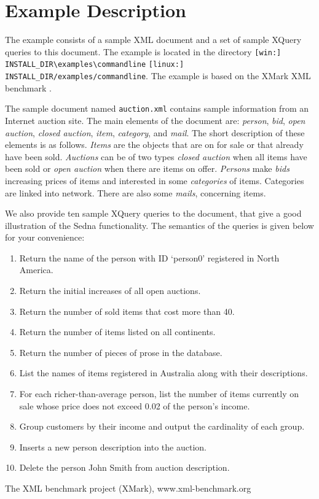 \documentclass[a4paper,12pt]{article}
\begin{document}
\section{Example Description}
\label{sec:example-description}
The example consists of a sample XML document and a set of sample XQuery queries to this document. The example is located in the directory \verb![win:] INSTALL_DIR\examples\commandline! \verb![linux:] INSTALL_DIR/examples/commandline!. The example is based on the XMark XML benchmark \cite{xmark}.

The sample document named \verb!auction.xml! contains sample information from an Internet auction site. The main elements of the document are: \emph{person}, \emph{bid}, \emph{open auction}, \emph{closed auction}, \emph{item}, \emph{category}, and \emph{mail}. The short description of these elements is as follows. \emph{Items} are the objects that are on for sale or that already have been sold. \emph{Auctions} can be of two types \emph{closed auction} when all items have been sold or \emph{open auction} when there are items on offer. \emph{Persons} make \emph{bids} increasing prices of items and interested in some \emph{categories} of items. Categories are linked into network. There are also some \emph{mails}, concerning items. 

We also provide ten sample XQuery queries to the document, that give a good illustration of the Sedna functionality. The semantics of the queries is given below for your convenience:
\begin{enumerate}
\item Return the name of the person with ID `person0' registered in North
 America.
\item Return the initial increases of all open auctions.
\item Return the number of sold items that cost more than 40.
\item Return the number of items listed on all continents.
\item Return the number of pieces of prose in the database.
\item List the names of items registered in Australia along with their
 descriptions.
\item For each richer-than-average person, list the number of items currently
 on sale whose price does not exceed 0.02 of the person's income.
\item Group customers by their income and output the cardinality of each group.
\item Inserts a new person description into the auction.
\item Delete the person John Smith from auction description.
\end{enumerate}

\begin{thebibliography}{9}
 The XML benchmark project (XMark), www.xml-benchmark.org
\end{thebibliography}
\end{document}
